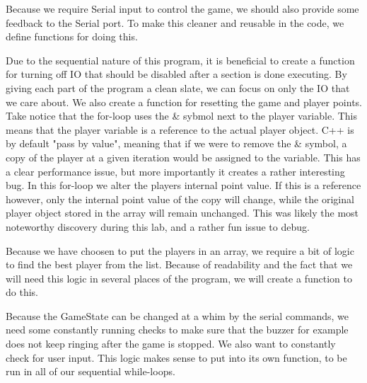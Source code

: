 \documentclass[journal]{IEEEtran}
\begin{document}

Because we require Serial input to control the game, we should also provide
some feedback to the Serial port. To make this cleaner and reusable
in the code, we define functions for doing this.

\vfill\null
\pagebreak


Due to the sequential nature of this program, it is beneficial to create a function for
turning off IO that should be disabled after a section is done executing. By giving each
part of the program a clean slate, we can focus on only the IO that we care about.
We also create a function for resetting the game and player points.\\

Take notice that the for-loop uses the \& sybmol next to the player variable. This means
that the player variable is a reference to the actual player object.
C++ is by default "pass by value", meaning that if we were to remove the \& symbol,
a copy of the player at a given iteration would be assigned to the variable.
This has a clear performance issue, but more importantly it creates a rather interesting bug.
In this for-loop we alter the players internal point value. If this is a reference however,
only the internal point value of the copy will change, while the original player
object stored in the array will remain unchanged. This was likely the most noteworthy discovery
during this lab, and a rather fun issue to debug.


Because we have choosen to put the players in an array, we require a bit of logic to find the
best player from the list. Because of readability and the fact that we will need this logic
in several places of the program, we will create a function to do this.

\vfill\null
\pagebreak


Because the GameState can be changed at a whim by the serial commands, we need some constantly
running checks to make sure that the buzzer for example does not keep ringing after the
game is stopped. We also want to constantly check for user input. This logic
makes sense to put into its own function, to be run in all of our sequential while-loops.\\
\end{document}
